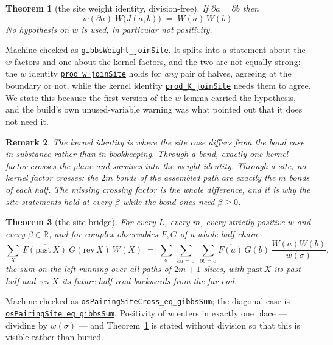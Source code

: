 \documentclass[11pt]{article}
\newtheorem{theorem}{Theorem}[section]
\newtheorem{remark}[theorem]{Remark}
\theoremstyle{definition}
\newcommand{\anchor}{c90dc745ab8cd1ba7ddc02aa16fed3de339bf958}
\newcommand{\osline}[3]{%
  \href{https://github.com/lluiseriksson/THE-ERIKSSON-PROGRAMME/blob/\anchor/YangMills/OS/#1.lean\#L#2}{\nolinkurl{#3}}}
\newcommand{\R}{\mathbb{R}}
\begin{document}
\begin{theorem}[the site weight identity, division-free]\label{thm:siteweight}
If $\partial a=\partial b$ then
\[
  w(\partial a)\;W\big(J(a,b)\big)\;=\;W(a)\,W(b).
\]
No hypothesis on $w$ is used, in particular not positivity.
\end{theorem}

Machine-checked as \osline{SpatialOS}{1017}{gibbsWeight\_joinSite}.  It
splits into a statement about the $w$ factors and one about the kernel factors,
and the two are not equally strong: the $w$ identity
\osline{SpatialOS}{962}{prod\_w\_joinSite} holds for \emph{any} pair of
halves, agreeing at the boundary or not, while the kernel identity
\osline{SpatialOS}{986}{prod\_K\_joinSite} needs them to agree.  We state
this because the first version of the $w$ lemma carried the hypothesis, and the
build's own unused-variable warning was what pointed out that it does not need
it.

\begin{remark}
The kernel identity is where the site case differs from the bond case in
substance rather than in bookkeeping.  Through a bond, exactly one kernel factor
crosses the plane and survives into the weight identity.  Through a site,
\emph{no} kernel factor crosses: the $2m$ bonds of the assembled path are
exactly the $m$ bonds of each half.  The missing crossing factor is the whole
difference, and it is why the site statements hold at every $\beta$ while the
bond ones need $\beta\ge0$.
\end{remark}

\begin{theorem}[the site bridge]\label{thm:sitebridge}
For every $L$, every $m$, every strictly positive $w$ and every $\beta\in\R$,
and for complex observables $F,G$ of a whole half-chain,
\[
  \sum_{X}\ \overline{F(\mathrm{past}\,X)}\ G(\mathrm{rev}\,X)\ W(X)
  \;=\;\sum_\sigma\ \sum_{\partial a=\sigma}\ \sum_{\partial b=\sigma}
    \overline{F(a)}\,G(b)\,\frac{W(a)W(b)}{w(\sigma)} ,
\]
the sum on the left running over all paths of $2m+1$ slices, with
$\mathrm{past}\,X$ its past half and $\mathrm{rev}\,X$ its future half read
backwards from the far end.
\end{theorem}

Machine-checked as
\osline{SpatialOS}{1088}{osPairingSiteCross\_eq\_gibbsSum}; the
diagonal case is \osline{SpatialOS}{1116}{osPairingSite\_eq\_gibbsSum}.
Positivity of $w$ enters in exactly one place --- dividing by $w(\sigma)$ ---
and Theorem~\ref{thm:siteweight} is stated without division so that this is
visible rather than buried.
\end{document}
